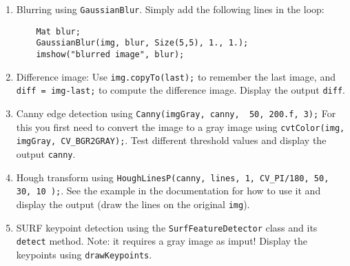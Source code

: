 \begin{enumerate}
\item Blurring using \verb+GaussianBlur+. Simply add the
  following lines in the loop:\\
\begin{code}
\begin{verbatim}
    Mat blur;
    GaussianBlur(img, blur, Size(5,5), 1., 1.);
    imshow("blurred image", blur);
\end{verbatim}
\end{code}

\item Difference image: Use \verb+img.copyTo(last);+ to remember the
  last image, and \verb+diff = img-last;+ to compute the difference
  image. Display the output \verb+diff+.

\item Canny edge detection using
  \verb+Canny(imgGray, canny,  50, 200.f, 3);+ For this you first
  need to convert the image to a gray image using
  \verb+cvtColor(img, imgGray, CV_BGR2GRAY);+. Test different
  threshold values and display the output \verb+canny+.

\item Hough transform using
  \verb+HoughLinesP(canny, lines, 1, CV_PI/180, 50, 30, 10 );+. See
  the example in the documentation for how to use it and display the
  output (draw the lines on the original \verb+img+).

\item SURF keypoint detection using the \verb+SurfFeatureDetector+
  class and its \verb+detect+ method. Note: it requires a gray image
  as imput! Display the keypoints using \verb+drawKeypoints+.
\end{enumerate}

\exerfoot

